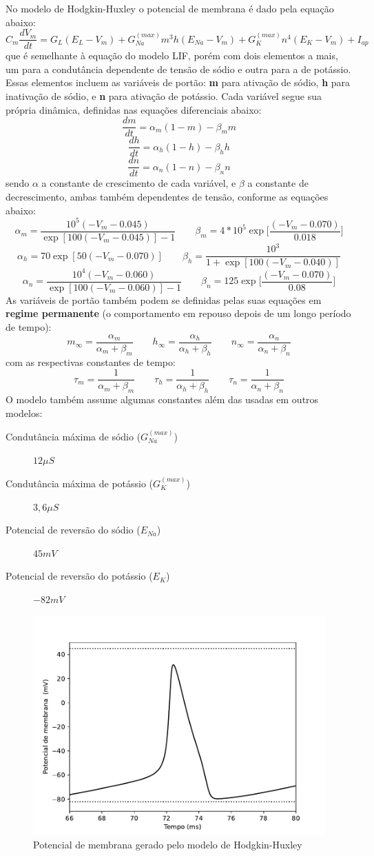 No modelo de Hodgkin-Huxley o potencial de membrana é dado pela equação abaixo:
$$
C_m\frac{dV_m}{dt}=G_L(E_L-V_m)+G_{Na}^{(max)}m^3h(E_{Na}-V_m)+G_K^{(max)}n^4(E_K-V_m)+I_{ap}
$$
que é semelhante à equação do modelo LIF, porém com dois elementos a mais, um para a condutância dependente de tensão de sódio e outra para a de potássio. Essas elementos incluem as variáveis de portão: \textbf{m} para ativação de sódio, \textbf{h} para inativação de sódio, e \textbf{n} para ativação de potássio. Cada variável segue sua própria dinâmica, definidas nas equações diferenciais abaixo:
$$
\frac{dm}{dt}=\alpha_m(1-m)-\beta_mm
$$$$
\frac{dh}{dt}=\alpha_h(1-h)-\beta_hh
$$$$
\frac{dn}{dt}=\alpha_n(1-n)-\beta_nn
$$
sendo $\alpha$ a constante de crescimento de cada variável, e $\beta$ a constante de decrescimento, ambas também dependentes de tensão, conforme as equações abaixo:
$$
\alpha_m=\frac{10^5(-V_m-0.045)}{\exp[100(-V_m-0.045)]-1}
\qquad
\beta_m=4*10^5\exp\Big[\frac{(-V_m-0.070)}{0.018}\Big]
$$$$
\alpha_h=70\exp[50(-V_m-0.070)]
\qquad
\beta_h=\frac{10^3}{1+\exp[100(-V_m-0.040)]}
$$$$
\alpha_n=\frac{10^4(-V_m-0.060)}{\exp[100(-V_m-0.060)]-1}
\qquad
\beta_n=125\exp\Big[\frac{(-V_m-0.070)}{0.08}\Big]
$$
As variáveis de portão também podem se definidas pelas suas equações em \textbf{regime permanente} (o comportamento em repouso depois de um longo período de tempo): \cite{ermentrout_mathematical_2010}
$$
m_\infty=\frac{\alpha_m}{\alpha_m+\beta_m}
\qquad
h_\infty=\frac{\alpha_h}{\alpha_h+\beta_h}
\qquad
n_\infty=\frac{\alpha_n}{\alpha_n+\beta_n}
$$
com as respectivas constantes de tempo:
$$
\tau_m=\frac{1}{\alpha_m+\beta_m}
\qquad
\tau_h=\frac{1}{\alpha_h+\beta_h}
\qquad
\tau_n=\frac{1}{\alpha_n+\beta_n}
$$
O modelo também assume algumas constantes além das usadas em outros modelos:
\begin{description}
	\item[Condutância máxima de sódio ($G_{Na}^{(max)}$)] $12\mu S$
	\item[Condutância máxima de potássio ($G_K^{(max)}$)] $3,6\mu S$
	\item[Potencial de reversão do sódio ($E_{Na}$)] $45mV$
	\item[Potencial de reversão do potássio ($E_K$)] $-82mV$
\end{description}

\begin{figure}[h!]
	\centering
	\caption{Potencial de membrana gerado pelo modelo de Hodgkin-Huxley}
	\label{fig:hhvm}
	\includegraphics[width=0.7\linewidth]{figs/hh_vm}
\end{figure}

